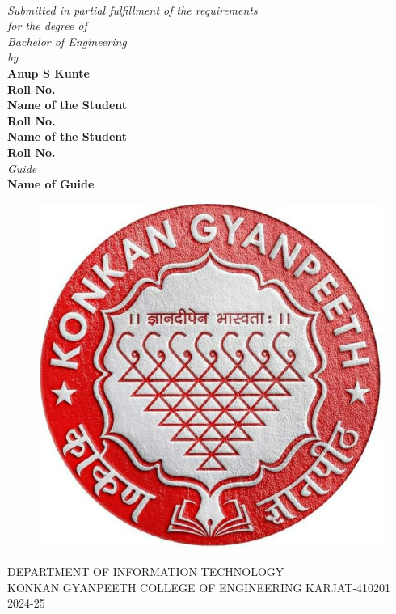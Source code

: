 \documentclass[12pt, a4paper, oneside]{Thesis} %
\begin{document}
\begin{titlepage}
\begin{center}

{\huge \bfseries {}}\\[0.10cm] %
 
\large \textit{Submitted in partial fulfillment of the requirements \\ for the degree of \\ Bachelor of Engineering}\\[0.03cm] %
\textit{by}\\[0.03cm]
\textbf{Anup S Kunte}\\[0.01cm]
\textbf{Roll No.}\\[0.05cm]
\textbf{Name of the Student}\\[0.01cm]
\textbf{Roll No.}\\[0.05cm]
\textbf{Name of the Student}\\[0.01cm]
\textbf{Roll No.}\\[0.05cm]
\textit{Guide}\\[0.01cm] 
\textbf{Name of Guide}\\[0.35cm]
\begin{figure}[hb!]
 \centering
 \includegraphics[scale=0.9]{Pictures/kgce_logo.png}
\end{figure}
\textsc{DEPARTMENT OF INFORMATION TECHNOLOGY \\[0.01cm]
KONKAN GYANPEETH COLLEGE OF ENGINEERING KARJAT-410201}\\[0.01cm] %
2024-25
\end{center}

\end{titlepage}
\end{document}
